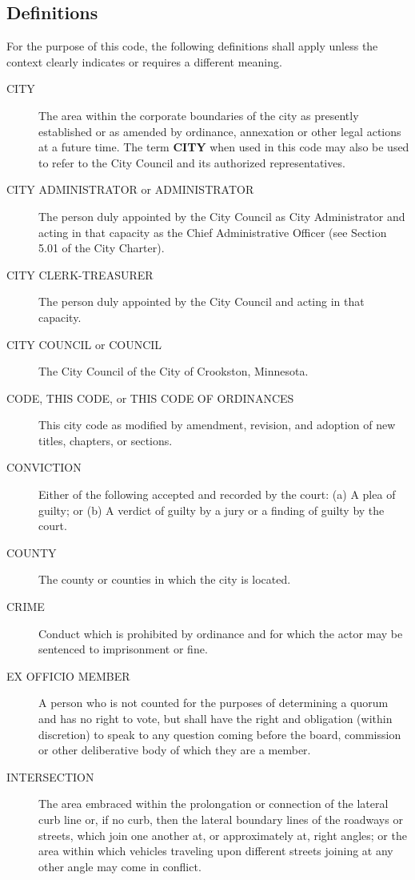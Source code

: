 \subsection{Definitions}
For the purpose of this code, the following definitions shall apply unless the context clearly indicates or requires a different meaning.
\begin{description}
\item[CITY] The area within the corporate boundaries of the city as presently established or as amended by ordinance, annexation or other legal actions at a future time.  The term \textbf{CITY} when used in this code may also be used to refer to the City Council and its authorized representatives.
\item[CITY ADMINISTRATOR or ADMINISTRATOR] The person duly appointed by the City Council as City Administrator and acting in that capacity as the Chief Administrative Officer (see Section 5.01 of the City Charter).
\item[CITY CLERK-TREASURER] The person duly appointed by the City Council and acting in that capacity.
\item[CITY COUNCIL or COUNCIL] The City Council of the City of Crookston, Minnesota.
\item[CODE, THIS CODE, or THIS CODE OF ORDINANCES] This city code as modified by amendment, revision, and adoption of new titles, chapters, or sections.
\item[CONVICTION] Either of the following accepted and recorded by the court:
\newline\indent
(a) A plea of guilty; or
\newline\indent
(b) A verdict of guilty by a jury or a finding of guilty by the court.
\item[COUNTY] The county or counties in which the city is located.
\item[CRIME] Conduct which is prohibited by ordinance and for which the actor may be sentenced to imprisonment or fine.
\item[EX OFFICIO MEMBER] A person who is not counted for the purposes of determining a quorum and has no right to vote, but shall have the right and obligation (within discretion) to speak to any question coming before the board, commission or other deliberative body of which they are a member.
\item[INTERSECTION] The area embraced within the prolongation or connection of the lateral curb line or, if no curb, then the lateral boundary lines of the roadways or streets, which join one another at, or approximately at, right angles; or the area within which vehicles traveling upon different streets joining at any other angle may come in conflict.

\end{description}
